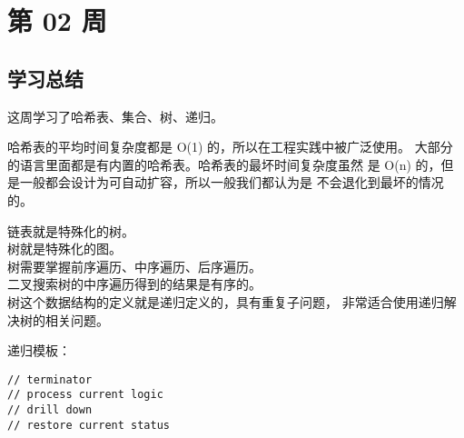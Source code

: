 \newpage
\section{第 02 周}





\subsection{学习总结}

这周学习了哈希表、集合、树、递归。

哈希表的平均时间复杂度都是 O(1) 的，所以在工程实践中被广泛使用。
大部分的语言里面都是有内置的哈希表。哈希表的最坏时间复杂度虽然
是 O(n) 的，但是一般都会设计为可自动扩容，所以一般我们都认为是
不会退化到最坏的情况的。

链表就是特殊化的树。\\
树就是特殊化的图。\\
树需要掌握前序遍历、中序遍历、后序遍历。\\
二叉搜索树的中序遍历得到的结果是有序的。\\
树这个数据结构的定义就是递归定义的，具有重复子问题，
非常适合使用递归解决树的相关问题。

递归模板：
\begin{verbatim}
// terminator
// process current logic
// drill down
// restore current status
\end{verbatim}
